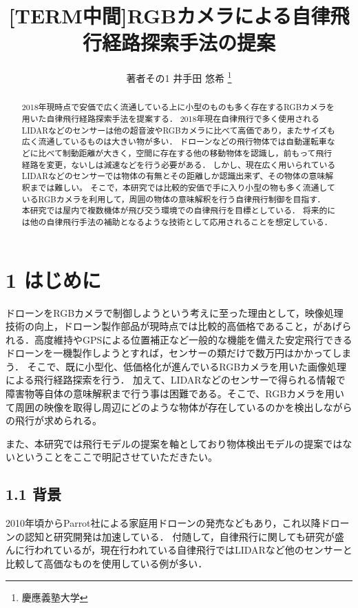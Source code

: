 \documentclass[a4j,10pt]{jsarticle}
\begin{document}

\title{[TERM中間]RGBカメラによる自律飛行経路探索手法の提案}

\author{
    著者その1 {井手田 悠希} \thanks{慶應義塾大学}
}

\begin{abstract}
2018年現時点で安価で広く流通している上に小型のものも多く存在するRGBカメラを用いた自律飛行経路探索手法を提案する．
2018年現在自律飛行で多く使用されるLIDARなどのセンサーは他の超音波やRGBカメラに比べて高価であり，またサイズも広く流通しているものは大きい物が多い．
ドローンなどの飛行物体では自動運転車などに比べて制動距離が大きく，空間に存在する他の移動物体を認識し，前もって飛行経路を変更，ないしは減速などを行う必要がある．
しかし、現在広く用いられているLIDARなどのセンサーでは物体の有無とその距離しか認識出来ず、その物体の意味解釈までは難しい。
そこで，本研究では比較的安価で手に入り小型の物も多く流通しているRGBカメラを利用して，周囲の物体の意味解釈を行う自律飛行制御を目指す．
本研究では屋内で複数機体が飛び交う環境での自律飛行を目標としている．
将来的には他の自律飛行手法の補助となるような技術として応用されることを想定している．

\end{abstract}

\maketitle
\thispagestyle{empty}

\section{1 はじめに}
ドローンをRGBカメラで制御しようという考えに至った理由として，映像処理技術の向上，ドローン製作部品が現時点では比較的高価格であること，があげられる．高度維持やGPSによる位置補正など一般的な機能を備えた安定飛行できるドローンを一機製作しようとすれば，センサーの類だけで数万円はかかってしまう．
そこで、既に小型化、低価格化が進んでいるRGBカメラを用いた画像処理による飛行経路探索を行う．
加えて、LIDARなどのセンサーで得られる情報で障害物等自体の意味解釈まで行う事は困難である。そこで、RGBカメラを用いて周囲の映像を取得し周辺にどのような物体が存在しているのかを検出しながらの飛行が求められる。

また、本研究では飛行モデルの提案を軸としており物体検出モデルの提案ではないということをここで明記させていただきたい。


\subsection{1.1 背景}
2010年頃からParrot社による家庭用ドローンの発売などもあり，これ以降ドローンの認知と研究開発は加速している．
付随して，自律飛行に関しても研究が盛んに行われているが，現在行われている自律飛行ではLIDARなど他のセンサーと比較して高価なものを使用している例が多い．
\end{document}

